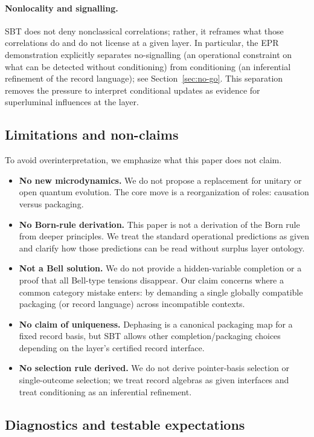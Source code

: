 \paragraph{Nonlocality and signalling.}
SBT does not deny nonclassical correlations; rather, it reframes what those correlations do and do not license at a given layer.
In particular, the EPR demonstration explicitly separates no-signalling (an operational constraint on what can be detected without conditioning) from conditioning (an inferential refinement of the record language); see Section~\ref{sec:no-go}.
This separation removes the pressure to interpret conditional updates as evidence for superluminal influences at the layer.

\subsection{Limitations and non-claims}

To avoid overinterpretation, we emphasize what this paper does not claim.

\begin{itemize}
  \item \textbf{No new microdynamics.} We do not propose a replacement for unitary or open quantum evolution. The core move is a reorganization of roles: causation versus packaging.
  \item \textbf{No Born-rule derivation.} This paper is not a derivation of the Born rule from deeper principles. We treat the standard operational predictions as given and clarify how those predictions can be read without surplus layer ontology.
  \item \textbf{Not a Bell solution.} We do not provide a hidden-variable completion or a proof that all Bell-type tensions disappear. Our claim concerns where a common category mistake enters: by demanding a single globally compatible packaging (or record language) across incompatible contexts.
  \item \textbf{No claim of uniqueness.} Dephasing is a canonical packaging map for a fixed record basis, but SBT allows other completion/packaging choices depending on the layer's certified record interface.
  \item \textbf{No selection rule derived.} We do not derive pointer-basis selection or single-outcome selection; we treat record algebras as given interfaces and treat conditioning as an inferential refinement.
\end{itemize}

\subsection{Diagnostics and testable expectations}


